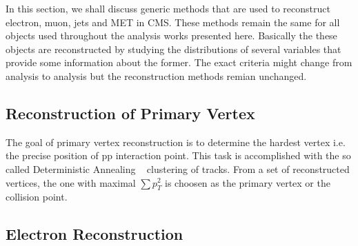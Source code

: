 In this section, we shall discuss generic methods that are used to reconstruct electron, muon, jets and MET in CMS. These methods remain the same for all  objects used throughout the analysis works presented here. Basically the these objects are reconstructed by studying the distributions of several variables that provide some information about the former. The exact criteria might change from analysis to analysis but the reconstruction methods remian unchanged.

\subsection{Reconstruction of Primary Vertex}

The goal of primary vertex reconstruction is to determine the hardest vertex i.e. the precise position of pp interaction point. This task is accomplished with the so called Deterministic Annealing ~\cite{PValgo} clustering of tracks. From a set of reconstructed vertices, the one with maximal $\sum p_{T}^{2}$ is choosen as the primary vertex or the collision point.




\subsection{Electron Reconstruction}

